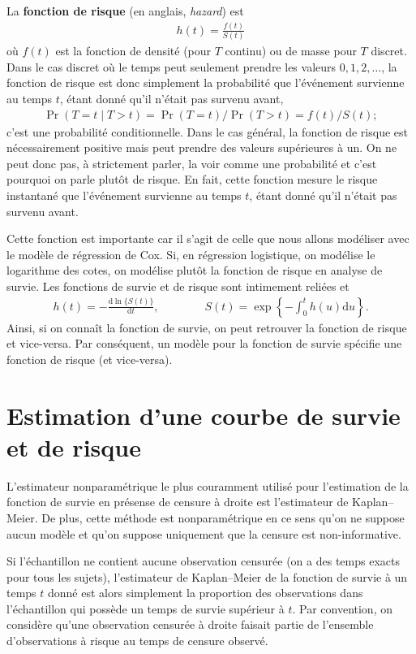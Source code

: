 \documentclass[
  11pt,
  letterpaper,
]{scrbook}
\theoremstyle{definition}
\theoremstyle{remark}
\begin{document}
La \textbf{fonction de risque} (en anglais, \emph{hazard}) est
\begin{align*}
h(t) =  \frac{f(t)}{S(t)}
\end{align*} où \(f(t)\) est la fonction de densité (pour \(T\) continu)
ou de masse pour \(T\) discret. Dans le cas discret où le temps peut
seulement prendre les valeurs \(0, 1, 2, \ldots\), la fonction de risque
est donc simplement la probabilité que l'événement survienne au temps
\(t\), étant donné qu'il n'était pas survenu avant, \begin{align*}
\Pr(T=t \mid T > t) = \Pr(T=t) / \Pr(T >t) = f(t)/S(t);
\end{align*} c'est une probabilité conditionnelle. Dans le cas général,
la fonction de risque est nécessairement positive mais peut prendre des
valeurs supérieures à un. On ne peut donc pas, à strictement parler, la
voir comme une probabilité et c'est pourquoi on parle plutôt de risque.
En fait, cette fonction mesure le risque instantané que l'événement
survienne au temps \(t\), étant donné qu'il n'était pas survenu avant.

Cette fonction est importante car il s'agit de celle que nous allons
modéliser avec le modèle de régression de Cox. Si, en régression
logistique, on modélise le logarithme des cotes, on modélise plutôt la
fonction de risque en analyse de survie. Les fonctions de survie et de
risque sont intimement reliées et \begin{align*}
h(t) = - \frac{\mathrm{d} \ln\{S(t)\}}{\mathrm{d} t}, \qquad \qquad S(t) = \exp \left\{ -\int_0^t h(u) \mathrm{d} u\right\}.
\end{align*} Ainsi, si on connaît la fonction de survie, on peut
retrouver la fonction de risque et vice-versa. Par conséquent, un modèle
pour la fonction de survie spécifie une fonction de risque (et
vice-versa).

\section{Estimation d'une courbe de survie et de
risque}\label{estimation-dune-courbe-de-survie-et-de-risque}

L'estimateur nonparamétrique le plus couramment utilisé pour
l'estimation de la fonction de survie en présense de censure à droite
est l'estimateur de Kaplan--Meier. De plus, cette méthode est
nonparamétrique en ce sens qu'on ne suppose aucun modèle et qu'on
suppose uniquement que la censure est non-informative.

Si l'échantillon ne contient aucune observation censurée (on a des temps
exacts pour tous les sujets), l'estimateur de Kaplan--Meier de la
fonction de survie à un temps \(t\) donné est alors simplement la
proportion des observations dans l'échantillon qui possède un temps de
survie supérieur à \(t\). Par convention, on considère qu'une
observation censurée à droite faisait partie de l'ensemble
d'observations à risque au temps de censure observé.
\end{document}
